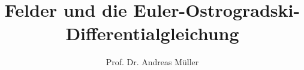 %
%
%


\beamertemplatenavigationsymbolsempty
\title[Felder]{Felder und die Euler-Ostrogradski-Differentialgleichung}
\author[A.~Müller]{Prof. Dr. Andreas Müller}
\date[]{}

